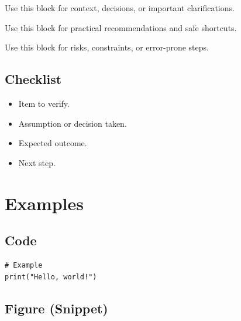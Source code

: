 \begin{noteBox}
Use this block for context, decisions, or important clarifications.
\end{noteBox}

\vspace{2mm}

\begin{tipBox}
Use this block for practical recommendations and safe shortcuts.
\end{tipBox}

\vspace{2mm}

\begin{warnBox}
Use this block for risks, constraints, or error-prone steps.
\end{warnBox}

\vspace{2mm}


\subsection{Checklist}
\vspace{2mm}

\begin{itemize}
  \item Item to verify.
  \item Assumption or decision taken.
  \item Expected outcome.
  \item Next step.
\end{itemize}

\vspace{2mm}


\section{Examples}
\vspace{2mm}

\subsection{Code}
\vspace{2mm}

\begin{lstlisting}
# Example
print("Hello, world!")
\end{lstlisting}

\vspace{2mm}


\subsection{Figure (Snippet)}
\vspace{2mm}

